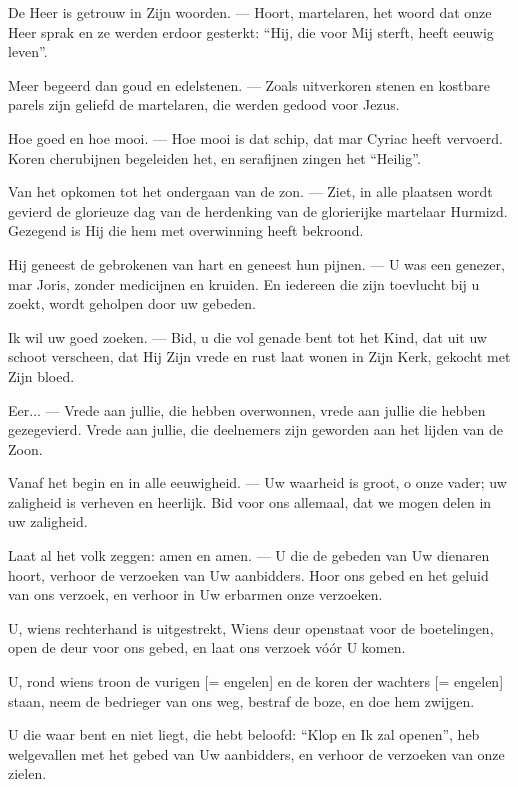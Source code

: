 \documentclass[12pt,twoside,a5paper]{article}
\begin{document}
\begin{halfparskip}
  De Heer is getrouw in Zijn woorden. --- Hoort, martelaren, het woord dat onze Heer sprak en ze werden erdoor gesterkt: ``Hij, die voor Mij sterft, heeft eeuwig leven''.

  Meer begeerd dan goud en edelstenen. --- Zoals uitverkoren stenen en kostbare parels zijn geliefd de martelaren, die werden gedood voor Jezus.

  Hoe goed en hoe mooi. --- Hoe mooi is dat schip, dat mar Cyriac heeft vervoerd. Koren cherubijnen begeleiden het, en serafijnen zingen het ``Heilig''.

  Van het opkomen tot het ondergaan van de zon. --- Ziet, in alle plaatsen wordt gevierd de glorieuze dag van de herdenking van de glorierijke martelaar Hurmizd. Gezegend is Hij die hem met overwinning heeft bekroond.

  Hij geneest de gebrokenen van hart en geneest hun pijnen. --- U was een genezer, mar Joris, zonder medicijnen en kruiden. En iedereen die zijn toevlucht bij u zoekt, wordt geholpen door uw gebeden.

  Ik wil uw goed zoeken. --- Bid, u die vol genade bent tot het Kind, dat uit uw schoot verscheen, dat Hij Zijn vrede en rust laat wonen in Zijn Kerk, gekocht met Zijn bloed.

  Eer... --- Vrede aan jullie, die hebben overwonnen, vrede aan jullie die hebben gezegevierd. Vrede aan jullie, die deelnemers zijn geworden aan het lijden van de Zoon.

  Vanaf het begin en in alle eeuwigheid. --- Uw waarheid is groot, o onze vader; uw zaligheid is verheven en heerlijk. Bid voor ons allemaal, dat we mogen delen in uw zaligheid.

  Laat al het volk zeggen: amen en amen. --- U die de gebeden van Uw dienaren hoort, verhoor de verzoeken van Uw aanbidders. Hoor ons gebed en het geluid van ons verzoek, en verhoor in Uw erbarmen onze verzoeken.

  U, wiens rechterhand is uitgestrekt, Wiens deur openstaat voor de boetelingen, open de deur voor ons gebed, en laat ons verzoek vóór U komen.

  U, rond wiens troon de vurigen [= engelen] en de koren der wachters [= engelen] staan, neem de bedrieger van ons weg, bestraf de boze, en doe hem zwijgen.

  U die waar bent en niet liegt, die hebt beloofd: ``Klop en Ik zal openen'', heb welgevallen met het gebed van Uw aanbidders, en verhoor de verzoeken van onze zielen.
\end{halfparskip}
\end{document}
